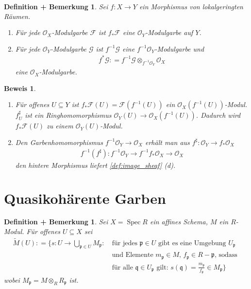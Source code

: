 \documentclass[a4paper,oneside]{scrbook}
\theoremstyle{break}
\newtheorem{DefBem}[Def]{Definition + Bemerkung}
\theoremstyle{nonumberbreak}
\theoremstyle{nonumberplain}
\newtheorem{Bew}{Beweis}
\theoremstyle{break}
\newcommand{\defeqr}[0]{\mathrel{\mathop:}=}
\newcommand{\Spec}{%
	\ensuremath{\operatorname{Spec}}%
}
\begin{document}
\begin{DefBem}
  \label{defbem:9.4}
  Sei $f:X\to Y$ ein Morphismus von lokalgeringten Räumen.
  \begin{enumerate}
  \item Für jede $\mathcal O_X$-Modulgarbe $\mathcal F$ ist $f_\ast\mathcal F$ eine $\mathcal O_Y$-Modulgarbe auf $Y$.
  \item Für jede $\mathcal O_Y$-Modulgarbe $\mathcal G$ ist $f^{-1}\mathcal G$ eine $f^{-1}\mathcal O_Y$-Modulgarbe und
    \begin{align*}
      f^\ast\mathcal G\defeqr f^{-1}\mathcal G\otimes_{f^{-1} \mathcal O_Y}\mathcal O_X
    \end{align*}
    eine $\mathcal O_X$-Modulgarbe.
  \end{enumerate}
\end{DefBem}

\begin{Bew}
  \begin{enumerate}
  \item Für offenes $U\subseteq Y$ ist $f_\ast \mathcal F(U)=\mathcal F(f^{-1}(U))$ ein $\mathcal O_X(f^{-1}(U))$-Modul.
    $f^\sharp_U$ ist ein Ringhomomorphismus $\mathcal O_Y(U)\to\mathcal O_X(f^{-1}(U))$. Dadurch wird $f_\ast\mathcal F(U)$
    zu einem $\mathcal O_Y(U)$-Modul.
  \item Den Garbenhomomorphismus $f^{-1}\mathcal O_Y\to\mathcal O_X$ erhält man aus $f^\sharp:\mathcal O_Y\to f_\ast\mathcal O_X$
    \begin{align*}
      f^{-1}(f^\sharp):f^{-1}\mathcal O_Y\to f^{-1}f_\ast\mathcal O_X\to\mathcal O_X
    \end{align*}
    den hintere Morphismus liefert \ref{def:image_sheaf} (d).
  \end{enumerate}
\end{Bew}

\section{Quasikohärente Garben}
\begin{DefBem}
  \label{defbem:10.1}
  Sei $X=\Spec R$ ein affines Schema, $M$ ein $R$-Modul. Für offenes $U\subseteq X$ sei
  \begin{align*}
    \widetilde{M}(U)\defeqr\{s:U\to\bigcup_{\mathfrak p\in U}M_{\mathfrak p}:~ &\text{für jedes $\mathfrak p\in U$ gibt es eine Umgebung $U_{\mathfrak p}$} \\
    &\text{und Elemente $m_{\mathfrak p}\in M$, $f_{\mathfrak p}\in R-\mathfrak p$, sodass } \\
    & \text{für alle $\mathfrak q\in U_{\mathfrak p}$ gilt: $s(\mathfrak q)=\frac{m_{\mathfrak p}}{f_{\mathfrak p}}\in M_{\mathfrak p}$}\}
  \end{align*}
  wobei $M_{\mathfrak p}=M\otimes_RR_{\mathfrak p}$ ist.
\end{DefBem}
\end{document}
